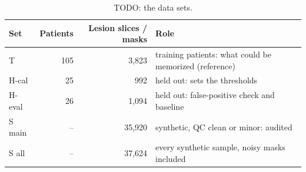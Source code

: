 \begin{table}
\centering
\small
\begin{tabular}{lrrl}
\toprule
Set & Patients & Lesion slices / masks & Role \\
\midrule
T & 105 & 3,823 & training patients: what could be memorized (reference) \\
H-cal & 25 & 992 & held out: sets the thresholds \\
H-eval & 26 & 1,094 & held out: false-positive check and baseline \\
S main & -- & 35,920 & synthetic, QC clean or minor: audited \\
S all & -- & 37,624 & every synthetic sample, noisy masks included \\
\bottomrule
\end{tabular}
\caption{TODO: the data sets.}
\label{tab:data_sets}
\end{table}
